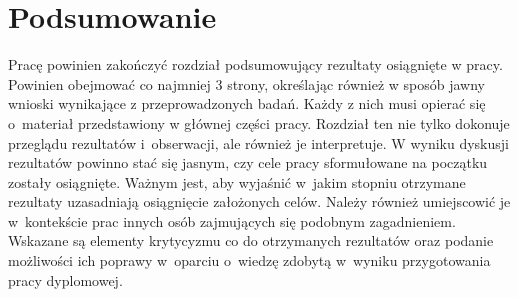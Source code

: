 \chapter{Podsumowanie}
Pracę powinien zakończyć rozdział podsumowujący rezultaty osiągnięte w pracy. Powinien obejmować co najmniej 3 strony, określając również w sposób jawny wnioski wynikające z przeprowadzonych badań. Każdy z nich musi opierać się o~materiał przedstawiony w głównej części pracy. Rozdział ten nie tylko dokonuje przeglądu rezultatów i~obserwacji, ale również je interpretuje. W wyniku dyskusji rezultatów powinno stać się jasnym, czy cele pracy sformułowane na początku zostały osiągnięte. Ważnym jest, aby wyjaśnić w~jakim stopniu otrzymane rezultaty uzasadniają osiągnięcie założonych celów. Należy również umiejscowić je w~kontekście prac innych osób zajmujących się podobnym zagadnieniem. Wskazane są elementy krytycyzmu co do otrzymanych rezultatów oraz podanie możliwości ich poprawy w~oparciu o~wiedzę zdobytą w~wyniku przygotowania pracy dyplomowej.